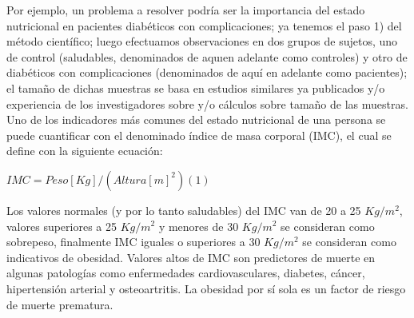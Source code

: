 \documentclass[12pt,letterpaper]{article}\usepackage[]{graphicx}\usepackage[]{color}
\begin{document}
Por ejemplo, un problema a resolver podr\'ia ser la importancia del estado nutricional en pacientes diab\'eticos con complicaciones; ya tenemos el paso 1) del m\'etodo cient\'ifico; luego efectuamos observaciones en dos grupos de sujetos, uno de control (saludables, denominados de aqu\i en adelante como controles) y otro de diab\'eticos con complicaciones (denominados de aqu\'i en adelante como pacientes); el tama\~no de dichas muestras se basa en estudios similares ya publicados y/o experiencia de los investigadores sobre y/o c\'alculos sobre tama\~no de las muestras.\\

Uno de los indicadores m\'as comunes del estado nutricional de una persona se puede cuantificar con el denominado \'indice de masa corporal (IMC), el cual se define con la siguiente ecuaci\'on:

\begin{center}
$IMC=Peso[Kg]/(Altura[m]^2)   (1)$
\end{center}

Los valores normales (y por lo tanto saludables) del IMC van de 20 a 25 $Kg/m^2$, valores superiores a 25 $Kg/m^2$ y menores de 30 $Kg/m^2$ se consideran como sobrepeso, finalmente IMC iguales o superiores a 30 $Kg/m^2$ se consideran como indicativos de obesidad. Valores altos de IMC son predictores de muerte en algunas patolog\'ias como enfermedades cardiovasculares, diabetes, c\'ancer, hipertensi\'on arterial y osteoartritis. La obesidad por s\'i sola es un factor de riesgo de muerte prematura.\\
\end{document}
